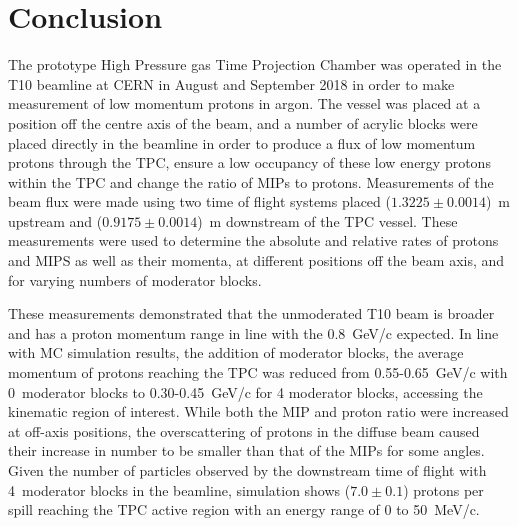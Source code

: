 \section{Conclusion}
\label{hptpcPaper:sec:Conclusion}

The prototype High Pressure gas Time Projection Chamber was operated in the T10 beamline at CERN in August and September 2018 in order to make measurement of low momentum protons in argon.
The vessel was placed at a position off the centre axis of the beam, and a number of acrylic blocks were placed directly in the beamline in order to produce a flux of low momentum protons through the TPC, ensure a low occupancy of these low energy protons within the TPC and change the ratio of MIPs to protons.
Measurements of the beam flux were made using two time of flight systems placed ($1.3225 \pm 0.0014$)~m upstream and ($0.9175 \pm 0.0014$)~m downstream of the TPC vessel.
These measurements were used to determine the absolute and relative rates of protons and MIPS as well as their momenta, at different positions off the beam axis, and for varying numbers of moderator blocks.

These measurements demonstrated that the unmoderated T10 beam is broader and has a proton momentum range in line with the 0.8~GeV/c expected.
In line with MC simulation results, the addition of moderator blocks, the average momentum of protons reaching the TPC was reduced from 0.55-0.65~GeV/c with 0~moderator blocks to 0.30-0.45~GeV/c for 4 moderator blocks, accessing the kinematic region of interest.
While both the MIP and proton ratio were increased at off-axis positions, the overscattering of protons in the diffuse beam caused their increase in number to be smaller than that of the MIPs for some angles.
Given the number of particles observed by the downstream time of flight with 4~moderator blocks in the beamline, simulation shows ($7.0 \pm  0.1$) protons per spill reaching the TPC active region with an energy range of 0 to 50~MeV/c.

